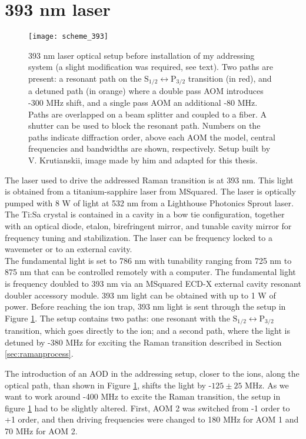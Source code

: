 \section{393 nm laser}
\label{sec:393setup}
\begin{figure}[!ht]
\centering
\texttt{[image: scheme\_393]}
\caption{393 nm laser optical setup before installation of my addressing system (a slight modification was required, see text). Two paths are present: a resonant path on the $\text{S}_{1/2} \leftrightarrow \text{P}_{3/2}$ transition (in red), and a detuned path (in orange) where a double pass AOM introduces -300 MHz shift, and a single pass AOM an additional -80 MHz. Paths are overlapped on a beam splitter and coupled to a fiber. A shutter can be used to block the resonant path. Numbers on the paths indicate diffraction order, above each AOM the model, central frequencies and bandwidths are shown, respectively. Setup built by V. Krutianskii, image made by him and adapted for this thesis.
}
\label{scheme393}
\end{figure}
The laser used to drive the addressed Raman transition is at 393 nm. This light is obtained from a titanium-sapphire laser from MSquared. The laser is optically pumped with 8 W of light at 532 nm from a Lighthouse Photonics Sprout laser. The Ti:Sa crystal is contained in a cavity in a bow tie configuration, together with an optical diode, etalon, birefringent mirror, and tunable cavity mirror for frequency tuning and stabilization. The laser can be frequency locked to a wavemeter or to an external cavity.\\ The fundamental light is set to 786 nm with tunability ranging from 725 nm to 875 nm that can be controlled remotely with a computer. The fundamental light is frequency doubled to 393 nm via an MSquared ECD-X external cavity resonant doubler accessory module. 393 nm light can be obtained with up to 1 W of power. Before reaching the ion trap, 393 nm light is sent through the setup in Figure \ref{scheme393}. The setup contains two paths: one resonant with the $\text{S}_{1/2} \leftrightarrow \text{P}_{3/2}$ transition, which goes directly to the ion; and a second path, where the light is detuned by -380 MHz for exciting the Raman transition described in Section \ref{sec:ramanprocess}.\par
The introduction of an AOD in the addressing setup, closer to the ions, along the optical path, than shown in Figure \ref{scheme393}, shifts the light by -$125\pm25$ MHz. As we want to work around -400 MHz to excite the Raman transition, the setup in figure \ref{scheme393} had to be slightly altered. First, AOM 2 was switched from -1 order to +1 order, and then driving frequencies were changed to 180 MHz for AOM 1 and 70 MHz for AOM 2.

